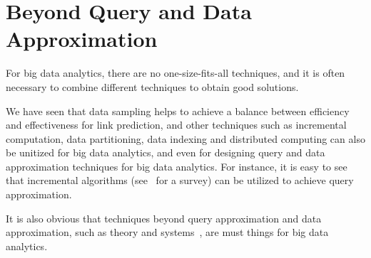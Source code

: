 \section{Beyond Query and Data Approximation}
\label{sec-beyond}

  For big data analytics, there are no one-size-fits-all techniques, and it is often necessary to combine different techniques to obtain good solutions.


We have seen that data sampling helps to achieve a balance between efficiency and effectiveness for link prediction,
and other techniques such as incremental computation, data partitioning, data indexing and distributed computing can
also be unitized for big data analytics, and even for designing query and data approximation techniques for big data analytics.
For instance, it is easy to see that incremental algorithms (see~\cite{Reps96} for a survey) can be utilized to achieve query approximation.

It is also obvious that techniques beyond query approximation and data approximation, such as theory and systems~\cite{FanGN13,Jordan15,ZahariaXWDADMRV16}, are must things for big data analytics.

